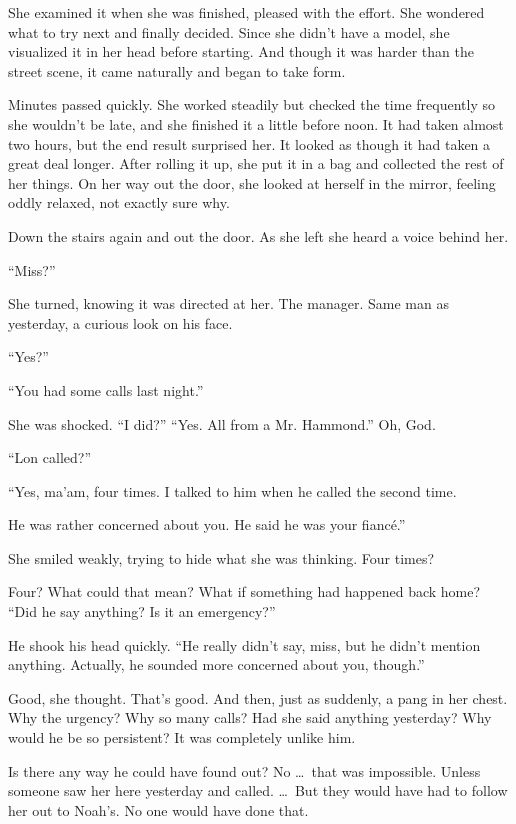 \documentclass[10pt, twoside, openright]{book}
\begin{document}
She examined it when she was finished, pleased with the effort. She
wondered what to try next and finally decided. Since she didn't have a
model, she visualized it in her head before starting. And though it was
harder than the street scene, it came naturally and began to take form.

Minutes passed quickly. She worked steadily but checked the time
frequently so she wouldn't be late, and she finished it a little before
noon. It had taken almost two hours, but the end result surprised her.
It looked as though it had taken a great deal longer. After rolling it
up, she put it in a bag and collected the rest of her things. On her way
out the door, she looked at herself in the mirror, feeling oddly
relaxed, not exactly sure why.

Down the stairs again and out the door. As she left she heard a voice
behind her.


``Miss?''


She turned, knowing it was directed at her. The manager. Same man as
yesterday, a curious look on his face.


``Yes?''

``You had some calls last night.''

She was shocked. ``I did?'' ``Yes. All from a Mr. Hammond.'' Oh, God.

``Lon called?''

``Yes, ma'am, four times. I talked to him when he called the second
time.


He was rather concerned about you. He said he was your fiancé.''


She smiled weakly, trying to hide what she was thinking. Four times?


Four? What could that mean? What if something had happened back home?
``Did he say anything? Is it an emergency?''

He shook his head quickly. ``He really didn't say, miss, but he didn't
mention anything. Actually, he sounded more concerned about you,
though.''

Good, she thought. That's good. And then, just as suddenly, a pang in
her chest. Why the urgency? Why so many calls? Had she said anything
yesterday? Why would he be so persistent? It was completely unlike him.

Is there any way he could have found out? No   \dots\ that was impossible.
Unless someone saw her here yesterday and called.   \dots\ But they would
have had to follow her out to Noah's. No one would have done that.
\end{document}

